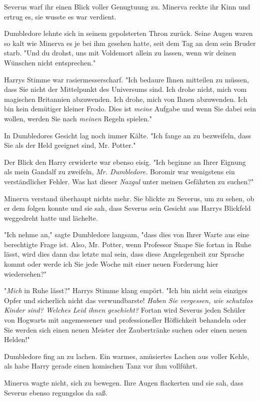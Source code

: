 {Severus warf ihr einen Blick voller Genugtuung zu. Minerva reckte ihr Kinn und ertrug es, sie wusste es war verdient.

Dumbledore lehnte sich in seinem gepolsterten Thron zurück. Seine Augen waren so kalt wie Minerva es je bei ihm gesehen hatte, seit dem Tag an dem sein Bruder starb. "Und du drohst, uns mit Voldemort allein zu lassen, wenn wir deinen Wünschen nicht entsprechen."

Harrys Stimme war rasiermesserscharf. "Ich bedaure Ihnen mitteilen zu müssen, dass Sie nicht der Mittelpunkt des Universums sind. Ich drohe nicht, mich vom magischen Britannien abzuwenden. Ich drohe, mich von Ihnen abzuwenden. Ich bin kein demütiger kleiner Frodo. Dies ist \emph{meine} Aufgabe und wenn Sie dabei sein wollen, werden Sie nach \emph{meinen} Regeln spielen."

In Dumbledores Gesicht lag noch immer Kälte. "Ich fange an zu bezweifeln, dass Sie als der Held geeignet sind, Mr. Potter."

Der Blick den Harry erwiderte war ebenso eisig. "Ich beginne an Ihrer Eignung als mein Gandalf zu zweifeln, \emph{Mr. Dumbledore.} Boromir war wenigstens ein verständlicher Fehler. Was hat dieser \emph{Nazgul} unter meinen Gefährten zu suchen?"

Minerva verstand überhaupt nichts mehr. Sie blickte zu Severus, um zu sehen, ob er dem folgen konnte und sie sah, dass Severus sein Gesicht aus Harrys Blickfeld weggedreht hatte und lächelte.

"Ich nehme an," sagte Dumbledore langsam, "dass dies von Ihrer Warte aus eine berechtigte Frage ist. Also, Mr. Potter, wenn Professor Snape Sie fortan in Ruhe lässt, wird dies dann das letzte mal sein, dass diese Angelegenheit zur Sprache kommt oder werde ich Sie jede Woche mit einer neuen Forderung hier wiedersehen?"

"\emph{Mich} in Ruhe lässt?" Harrys Stimme klang empört. "Ich bin nicht sein einziges Opfer und sicherlich nicht das verwundbarste! \emph{Haben Sie vergessen, wie schutzlos Kinder sind? Welches Leid ihnen geschieht?} Fortan wird Severus jeden Schüler von Hogwarts mit angemessener und professioneller Höflichkeit behandeln oder Sie werden sich einen neuen Meister der Zaubertränke suchen oder einen neuen Helden!"

Dumbledore fing an zu lachen. Ein warmes, amüsiertes Lachen aus voller Kehle, als habe Harry gerade einen komischen Tanz vor ihm vollführt.

Minerva wagte nicht, sich zu bewegen. Ihre Augen flackerten und sie sah, dass Severus ebenso regungslos da saß.

}
